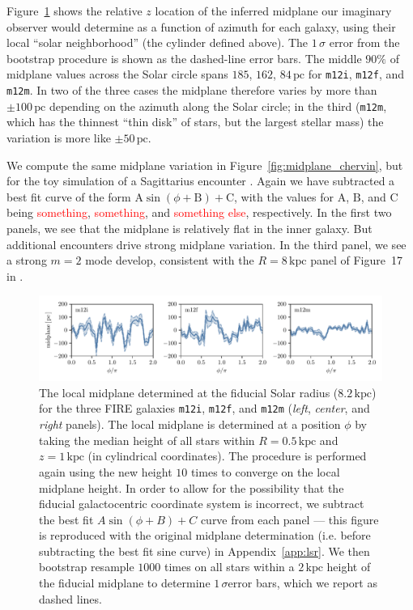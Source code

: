 \documentclass[twocolumn]{aastex62}
\newcommand{\Gus}[1]{\textcolor{red}{#1}}
\newcommand{\pc}{\text{pc}}
\newcommand{\kpc}{\text{kpc}}
\newcommand{\mi}{\texttt{m12i}}
\newcommand{\mf}{\texttt{m12f}}
\newcommand{\mm}{\texttt{m12m}}
\begin{document}
Figure~\ref{fig:midplane} shows the relative $z$ location of the inferred
midplane our imaginary observer would determine as a function of azimuth for
each galaxy, using their local ``solar neighborhood'' (the cylinder defined
above). The $1\,\sigma$ error from the bootstrap procedure is shown as the
dashed-line error bars. The middle $90\%$ of midplane values across the Solar
circle spans $185$, $162$, $84\,\pc$ for \mi{}, \mf{}, and \mm{}. In two of
the three cases the midplane therefore varies by more than $\pm 100\,\pc$
depending on the azimuth along the Solar circle; in the third (\mm{}, which
has the thinnest ``thin disk'' of stars, but the largest stellar mass) the
variation is more like $\pm 50\,\pc$.

We compute the same midplane variation in Figure~\ref{fig:midplane_chervin},
but for the toy simulation of a Sagittarius encounter
\citep{2018MNRAS.481..286L}. Again we have subtracted a best fit curve of the
form $\text{A} \sin{\left(\phi + \text{B}\right)} + \text{C}$, with the values
for $\text{A}$, $\text{B}$, and $\text{C}$ being \Gus{something},
\Gus{something}, and \Gus{something else}, respectively. In the first two
panels, we see that the midplane is relatively flat in the inner galaxy. But
additional encounters drive strong midplane variation. In the third panel, we
see a strong $m=2$ mode develop, consistent with the $R=8\,\kpc$ panel of
Figure~17 in \citet{2018MNRAS.481..286L}.

\begin{figure}
\begin{center}
\includegraphics[width=7in]{fig/midplane_fit.pdf}
\end{center}
\caption{The local midplane determined at the fiducial Solar radius
($8.2\,\kpc$) for the three FIRE galaxies \mi{}, \mf{}, and \mm{} ({\em left},
{\em center}, and {\em right} panels). The local midplane is determined at a
position $\phi$ by taking the median height of all stars within $R=0.5\,\kpc$
and $z=1\,\kpc$ (in cylindrical coordinates). The procedure is performed again
using the new height $10$ times to converge on the local midplane height. In
order to allow for the possibility that the fiducial galactocentric coordinate
system is incorrect, we subtract the best fit $A\sin{(\phi+B)}+C$ curve from
each panel --- this figure is reproduced with the original midplane
determination (i.e. before subtracting the best fit sine curve) in
Appendix~\ref{app:lsr}. We then bootstrap resample $1000$ times on all stars
within a $2\,\kpc$ height of the fiducial midplane to determine $1\,\sigma
$error bars, which we report as dashed lines.}
\label{fig:midplane}
\end{figure}
\end{document}
